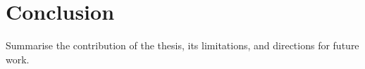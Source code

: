 \chapter{Conclusion}
\label{chap:conclusion}

Summarise the contribution of the thesis, its limitations, and directions
for future work.
